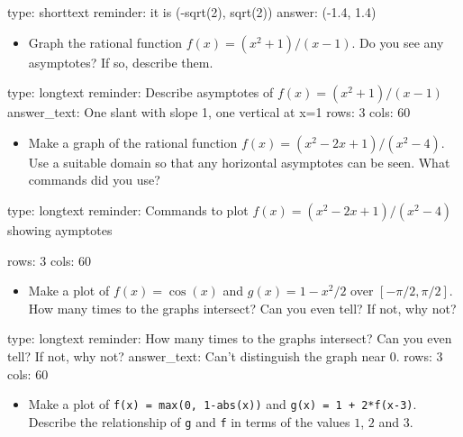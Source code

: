 \documentclass[12pt]{article}
\begin{document}
\begin{answer}
type: shorttext
reminder: it is (-sqrt(2), sqrt(2))
answer: (-1.4, 1.4)

\end{answer}

\begin{itemize}
\itemsep1pt\parskip0pt
\item
  Graph the rational function $f(x) = (x^2 + 1)/ (x - 1)$. Do you see
  any asymptotes? If so, describe them.
\end{itemize}

\begin{answer}
type: longtext
reminder: Describe asymptotes of \(f(x) = (x^2 + 1)/ (x - 1) \)
answer_text: One slant with slope 1, one vertical at x=1 
rows: 3
cols: 60
\end{answer}

\begin{itemize}
\itemsep1pt\parskip0pt
\item
  Make a graph of the rational function
  $f(x) = (x^2 - 2x + 1)/(x^2 -   4)$. Use a suitable domain so that any
  horizontal asymptotes can be seen. What commands did you use?
\end{itemize}

\begin{answer}
type: longtext
reminder: Commands to plot \( f(x) = (x^2 - 2x + 1)/(x^2 - 4) \) showing aymptotes

rows: 3
cols: 60
\end{answer}

\begin{itemize}
\itemsep1pt\parskip0pt
\item
  Make a plot of $f(x) = \cos(x)$ and $g(x) = 1 - x^2/2$ over
  $[-\pi/2, \pi/2]$. How many times to the graphs intersect? Can you
  even tell? If not, why not?
\end{itemize}

\begin{answer}
type: longtext
reminder: How many times to the graphs intersect? Can you even tell? If not, why not?
answer_text: Can't distinguish the graph near 0. 
rows: 3
cols: 60
\end{answer}

\begin{itemize}
\itemsep1pt\parskip0pt
\item
  Make a plot of \texttt{f(x) = max(0, 1-abs(x))} and
  \texttt{g(x) = 1 +   2*f(x-3)}. Describe the relationship of
  \texttt{g} and \texttt{f} in terms of the values $1$, $2$ and $3$.
\end{itemize}
\end{document}
